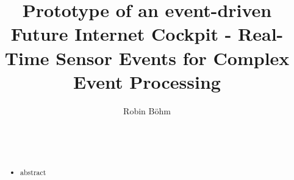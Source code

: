 \documentclass{acm_proc_article-sp}
\begin{document}
\title{Prototype of an event-driven Future Internet Cockpit -  Real-Time Sensor Events for Complex Event Processing}

%
%
%
%
%

%
\author{
%
%
\alignauthor
Robin B\"ohm\\
       \\
       \\
       \\
}

\maketitle
\begin{abstract}

\begin{itemize}
	\item abstract
\end{itemize}

\end{abstract}
\end{document}

